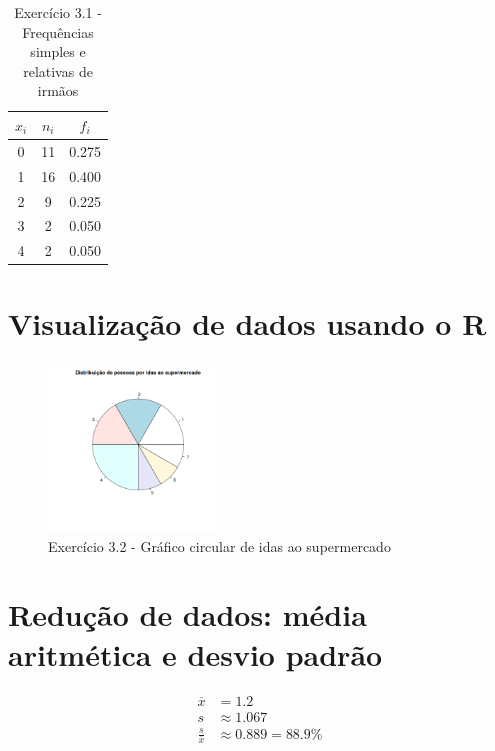 \documentclass[11pt,a4paper]{report}
\begin{document}
\begin{table}[h!]
	\centering
	\begin{tabular}{|c|c|c|}
		\hline
		$x_i$&$n_i$&$f_i$ \\
		\hline
		0&11&0.275\\
		\hline
		1&16&0.400\\
		\hline
		2& 9&0.225\\
		\hline
		3& 2&0.050\\
		\hline
		4& 2&0.050\\
		\hline
	\end{tabular}
	\caption{Exercício 3.1 - Frequências simples e relativas de irmãos}
	\label{tab:3.1}
\end{table}


\clearpage

\section{Visualização de dados usando o R}

\begin{figure}[h!]
	\centering
	\includegraphics[width=0.4\textwidth]{./recursos/ex3_2.png}
	\caption{Exercício 3.2 - Gráfico circular de idas ao supermercado}
\end{figure}


\clearpage
\section{Redução de dados: média aritmética e desvio padrão}

\begin{align*}
	\overline{x} &= 1.2\\
	s &\approx 1.067 \\
	\frac{s}{\overline{x}} &\approx 0.889 = 88.9 \%
\end{align*}
\end{document}

